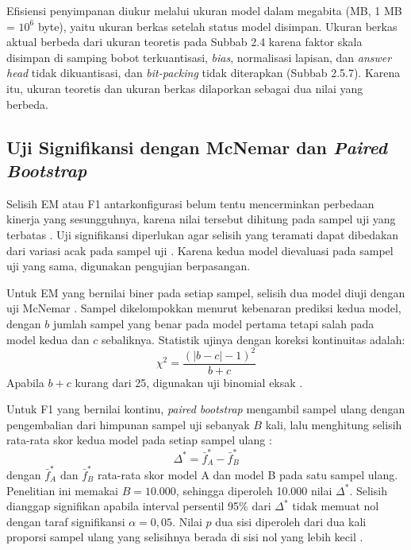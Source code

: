 Efisiensi penyimpanan diukur melalui ukuran model dalam megabita (MB, 1 MB = $10^{6}$ byte), yaitu ukuran berkas setelah status model disimpan. Ukuran berkas aktual berbeda dari ukuran teoretis pada Subbab 2.4 karena faktor skala disimpan di samping bobot terkuantisasi, \textit{bias}, normalisasi lapisan, dan \textit{answer head} tidak dikuantisasi, dan \textit{bit-packing} tidak diterapkan (Subbab 2.5.7). Karena itu, ukuran teoretis dan ukuran berkas dilaporkan sebagai dua nilai yang berbeda.

\subsection{Uji Signifikansi dengan McNemar dan \textit{Paired Bootstrap}}

Selisih EM atau F1 antarkonfigurasi belum tentu mencerminkan perbedaan kinerja yang sesungguhnya, karena nilai tersebut dihitung pada sampel uji yang terbatas \parencite{dror2018hitchhiker}. Uji signifikansi diperlukan agar selisih yang teramati dapat dibedakan dari variasi acak pada sampel uji \parencite{dror2018hitchhiker}. Karena kedua model dievaluasi pada sampel uji yang sama, digunakan pengujian berpasangan.

Untuk EM yang bernilai biner pada setiap sampel, selisih dua model diuji dengan uji McNemar \parencite{dror2018hitchhiker, mcnemar1947}. Sampel dikelompokkan menurut kebenaran prediksi kedua model, dengan $b$ jumlah sampel yang benar pada model pertama tetapi salah pada model kedua dan $c$ sebaliknya. Statistik ujinya dengan koreksi kontinuitas \parencite{edwards1948continuity} adalah:
\begin{equation}
  \chi^2 = \frac{\left(|b - c| - 1\right)^2}{b + c}
  \label{eq:mcnemar}
\end{equation}
Apabila $b + c$ kurang dari 25, digunakan uji binomial eksak \parencite{fagerland2013mcnemar}.

Untuk F1 yang bernilai kontinu, \textit{paired bootstrap} mengambil sampel ulang dengan pengembalian dari himpunan sampel uji sebanyak $B$ kali, lalu menghitung selisih rata-rata skor kedua model pada setiap sampel ulang \parencite{bergkirkpatrick2012, efron1993}:
\begin{equation}
  \Delta^{*} = \bar{f}^{*}_{A} - \bar{f}^{*}_{B}
  \label{eq:bootstrap}
\end{equation}
\noindent dengan $\bar{f}^{*}_{A}$ dan $\bar{f}^{*}_{B}$ rata-rata skor model A dan model B pada satu sampel ulang. Penelitian ini memakai $B = 10.000$, sehingga diperoleh 10.000 nilai $\Delta^{*}$. Selisih dianggap signifikan apabila interval persentil 95\% dari $\Delta^{*}$ tidak memuat nol dengan taraf signifikansi $\alpha = 0{,}05$. Nilai $p$ dua sisi diperoleh dari dua kali proporsi sampel ulang yang selisihnya berada di sisi nol yang lebih kecil \parencite{efron1993}.

